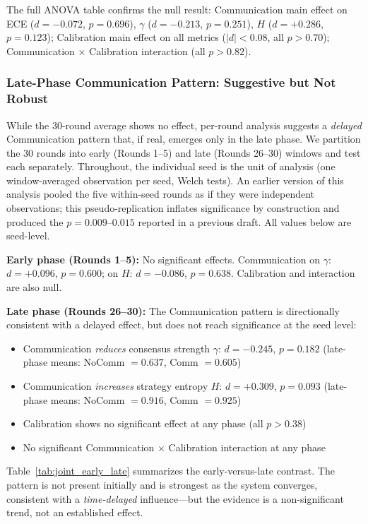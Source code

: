 \documentclass[11pt]{article}
\theoremstyle{definition}
\theoremstyle{remark}
\begin{document}
The full ANOVA table confirms the null result: Communication main effect on ECE ($d{=}-0.072$, $p{=}0.696$), $\gamma$ ($d{=}-0.213$, $p{=}0.251$), $H$ ($d{=}+0.286$, $p{=}0.123$); Calibration main effect on all metrics ($|d| < 0.08$, all $p > 0.70$); Communication $\times$ Calibration interaction (all $p > 0.82$).

\subsubsection{Late-Phase Communication Pattern: Suggestive but Not Robust}

While the 30-round average shows no effect, per-round analysis suggests a \textit{delayed} Communication pattern that, if real, emerges only in the late phase. We partition the 30 rounds into early (Rounds 1--5) and late (Rounds 26--30) windows and test each separately. Throughout, the individual seed is the unit of analysis (one window-averaged observation per seed, Welch tests). An earlier version of this analysis pooled the five within-seed rounds as if they were independent observations; this pseudo-replication inflates significance by construction and produced the $p {=} 0.009$--$0.015$ reported in a previous draft. All values below are seed-level.

\textbf{Early phase (Rounds 1--5):} No significant effects. Communication on $\gamma$: $d{=}+0.096$, $p{=}0.600$; on $H$: $d{=}-0.086$, $p{=}0.638$. Calibration and interaction are also null.

\textbf{Late phase (Rounds 26--30):} The Communication pattern is directionally consistent with a delayed effect, but does not reach significance at the seed level:

\begin{itemize}[leftmargin=*,nosep]
    \item Communication \textit{reduces} consensus strength $\gamma$: $d{=}-0.245$, $p{=}0.182$ (late-phase means: NoComm $=0.637$, Comm $=0.605$)
    \item Communication \textit{increases} strategy entropy $H$: $d{=}+0.309$, $p{=}0.093$ (late-phase means: NoComm $=0.916$, Comm $=0.925$)
    \item Calibration shows no significant effect at any phase (all $p > 0.38$)
    \item No significant Communication $\times$ Calibration interaction at any phase
\end{itemize}

Table~\ref{tab:joint_early_late} summarizes the early-versus-late contrast. The pattern is not present initially and is strongest as the system converges, consistent with a \textit{time-delayed} influence---but the evidence is a non-significant trend, not an established effect.
\end{document}
